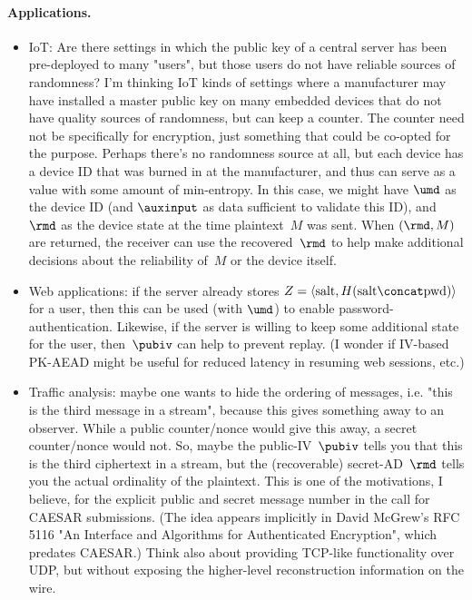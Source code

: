 \paragraph{Applications. }
\begin{itemize}
\item IoT: Are there settings in which the public key of a central server has been pre-deployed to many "users", but those users do not have reliable sources of randomness? I'm thinking IoT kinds of settings where a manufacturer may have installed a master public key on many embedded devices that do not have quality sources of randomness, but can keep a counter.  The counter need not be specifically for encryption, just something that could be co-opted for the purpose.  Perhaps there's no randomness source at all, but each device has a device ID that was burned in at the manufacturer, and thus can serve as a value with some amount of min-entropy.  In this case, we might have $\umd$ as the device ID (and $\auxinput$ as data sufficient to validate this ID), and $\rmd$ as the device state at the time plaintext~$M$ was sent.  When $(\rmd,M)$ are returned, the receiver can use the recovered~$\rmd$ to help make additional decisions about the reliability of~$M$ or the device itself.
%
\item Web applications: if the server already stores $Z=\langle \mathrm{salt},H(\mathrm{salt}\concat \mathrm{pwd})\rangle$ for a user, then this can be used (with $\umd$) to enable password-authentication.  Likewise, if the server is willing to keep some additional state for the user, then~$\pubiv$ can help to prevent replay.  (I wonder if IV-based PK-AEAD might be useful for reduced latency in resuming web sessions, etc.)
%
\item Traffic analysis: maybe one wants to hide the ordering of messages, i.e. "this is the third message in a stream", because this gives something away to an observer.  While a public counter/nonce would give this away, a secret counter/nonce would not.  So, maybe the public-IV~$\pubiv$ tells you that this is the third ciphertext in a stream, but the (recoverable) secret-AD~$\rmd$ tells you the actual ordinality of the plaintext.  This is one of the motivations, I believe, for the explicit public and secret message number in the call for CAESAR submissions.  (The idea appears implicitly in David McGrew's RFC 5116 "An Interface and Algorithms for Authenticated Encryption", which predates CAESAR.)  Think also about providing TCP-like functionality over UDP, but without exposing the higher-level reconstruction information on the wire.

\end{itemize}
